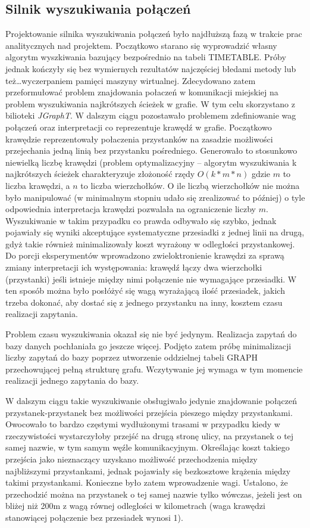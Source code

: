 \documentclass[a4paper,12pt]{article}
\begin{document}
  \subsection{Silnik wyszukiwania połączeń}
  Projektowanie silnika wyszukiwania połączeń było najdłuższą fazą w trakcie
  prac analitycznych nad projektem. Początkowo starano się wyprowadzić własny
  algorytm wyszkiwania bazujący bezpośrednio na tabeli TIMETABLE. Próby jednak
  kończyły się bez wymiernych rezultatów najczęściej błedami metody lub
  też\ldots wyczerpaniem pamięci maszyny wirtualnej.
  Zdecydowano zatem przeformułować problem znajdowania połaczeń w komunikacji
  miejskiej na problem wyszukiwania najkrótszych ścieżek w grafie. W tym celu
  skorzystano z bilioteki \emph{JGraphT}. W dalszym ciągu pozostawało problemem
  zdefiniowanie wag połączeń oraz interpretacji co reprezentuje krawędź w
  grafie. Początkowo krawędzie reprezentowały połaczenia przystanków na
  zasadzie możliwości przejechania jedną linią bez przystanku pośredniego.
  Generowało to stosunkowo niewielką liczbę krawędzi (problem optymalizacyjny
  -- algorytm wyszukiwania k najkrótszych ścieżek charakteryzuje złożoność
  rzędy $O(k*m*n)$ gdzie $m$ to liczba krawędzi, a $n$ to liczba wierzchołków.
  O ile liczbą wierzchołków nie można było manipulować (w minimalnym stopniu
  udało się zrealizować to później) o tyle odpowiednia interpretacja krawędzi
  pozwalała na ograniczenie liczby $m$. Wyszukiwanie w takim przypadku co
  prawda odbywało się szybko, jednak pojawiały się wyniki akceptujące
  systematyczne przesiadki z jednej linii na drugą, gdyż takie również
  minimalizowały koszt wyrażony w odległości przystankowej. Do porcji
  eksperymentów wprowadzono zwieloktronienie krawędzi za sprawą zmiany
  interpretacji ich występowania: krawędź łączy dwa wierzchołki (przystanki)
  jeśli istnieje między nimi połączenie nie wymagające przesiadki. W ten sposób
  można było posłóżyć się wagą wyrażającą ilość przesiadek, jakich trzeba
  dokonać, aby dostać się z jednego przystanku na inny, kosztem czasu
  realizacji zapytania.
  
  Problem czasu wyszukiwania okazał się nie być jedynym. Realizacja zapytań do
  bazy danych pochłaniała go jeszcze więcej. Podjęto zatem próbę minimalizacji
  liczby zapytań do bazy poprzez utworzenie oddzielnej tabeli GRAPH
  przechowującej pełną strukturę grafu. Wczytywanie jej wymaga w tym momencie
  realizacji jednego zapytania do bazy. 
  
  W dalszym ciągu takie wyszukiwanie obsługiwało jedynie znajdowanie połączeń
  przystanek-przystanek bez możliwości przejścia pieszego między przystankami.
  Owocowało to bardzo częstymi wydłużonymi trasami w przypadku kiedy w
  rzeczywistości wystarczyłoby przejść na drugą stronę ulicy, na przystanek o
  tej samej nazwie, w tym samym węźle komunikacyjnym. Określając koszt takiego
  przejścia jako nieznaczący uzyskano możliwość przechodzenia między
  najbliższymi przystankami, jednak pojawiały się bezkosztowe krążenia między
  takimi przystankami. Konieczne było zatem wprowadzenie wagi. Ustalono, że
  przechodzić można na przystanek o tej samej nazwie tylko wówczas, jeżeli jest
  on bliżej niż 200m z wagą równej odleglości w kilometrach (waga krawędzi
  stanowiącej połączenie bez przesiadek wynosi 1).
  
\end{document}
